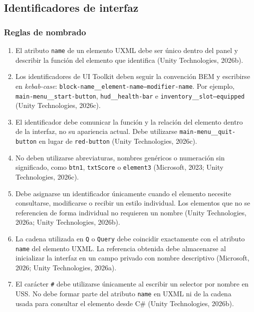 \subsection{Identificadores de interfaz}

\subsubsection{Reglas de nombrado}

\begin{enumerate}
    \item El atributo \texttt{name} de un elemento UXML debe ser único dentro del panel y describir la función del elemento que identifica (Unity Technologies, 2026b).

    \item Los identificadores de UI Toolkit deben seguir la convención BEM y escribirse en \textit{kebab-case}: \texttt{block-name\_\_element-name--modifier-name}. Por ejemplo, \texttt{main-menu\_\_start-button}, \texttt{hud\_\_health-bar} e \texttt{inventory\_\_slot--equipped} (Unity Technologies, 2026c).

    \item El identificador debe comunicar la función y la relación del elemento dentro de la interfaz, no su apariencia actual. Debe utilizarse \texttt{main-menu\_\_quit-button} en lugar de \texttt{red-button} (Unity Technologies, 2026c).

    \item No deben utilizarse abreviaturas, nombres genéricos o numeración sin significado, como \texttt{btn1}, \texttt{txtScore} o \texttt{element3} (Microsoft, 2023; Unity Technologies, 2026c).

    \item Debe asignarse un identificador únicamente cuando el elemento necesite consultarse, modificarse o recibir un estilo individual. Los elementos que no se referencien de forma individual no requieren un nombre (Unity Technologies, 2026a; Unity Technologies, 2026b).

    \item La cadena utilizada en \texttt{Q} o \texttt{Query} debe coincidir exactamente con el atributo \texttt{name} del elemento UXML. La referencia obtenida debe almacenarse al inicializar la interfaz en un campo privado con nombre descriptivo (Microsoft, 2026; Unity Technologies, 2026a).

    \item El carácter \texttt{\#} debe utilizarse únicamente al escribir un selector por nombre en USS. No debe formar parte del atributo \texttt{name} en UXML ni de la cadena usada para consultar el elemento desde C\# (Unity Technologies, 2026b).
\end{enumerate}

